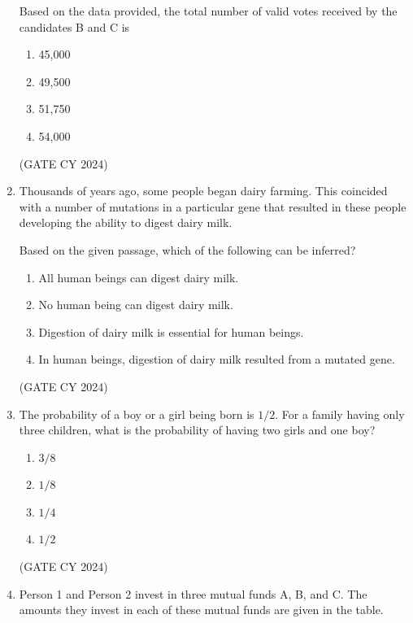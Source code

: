 \documentclass[12pt]{article}
\begin{document}
\begin{enumerate}
Based on the data provided, the total number of valid votes received by the candidates B and C is

\begin{enumerate}
\item 45,000
\item 49,500
\item 51,750
\item 54,000
\end{enumerate}

\hfill (GATE CY 2024)

\item Thousands of years ago, some people began dairy farming. This coincided with a number of mutations in a particular gene that resulted in these people developing the ability to digest dairy milk.

Based on the given passage, which of the following can be inferred?

\begin{enumerate}
\item All human beings can digest dairy milk.
\item No human being can digest dairy milk.
\item Digestion of dairy milk is essential for human beings.
\item In human beings, digestion of dairy milk resulted from a mutated gene.
\end{enumerate}
\hfill (GATE CY 2024)

\item The probability of a boy or a girl being born is $1/2$. For a family having only three children, what is the probability of having two girls and one boy?
\begin{multicols}{2}
\begin{enumerate}
\item $3/8$
\item $1/8$
\item $1/4$
\item $1/2$
\end{enumerate}
\end{multicols}
\hfill (GATE CY 2024)


\item Person 1 and Person 2 invest in three mutual funds A, B, and C. The amounts they invest in each of these mutual funds are given in the table.

\begin{center}

 \captionsetup{type=table}
\end{center}


\end{enumerate}
\end{document}
